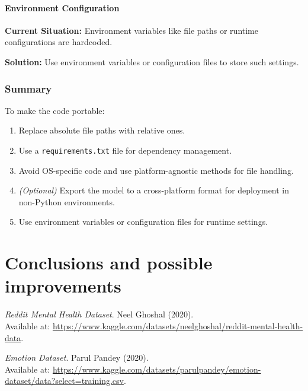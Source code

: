 \documentclass[runningheads,a4paper,11pt]{report}
\begin{document}
\subsubsection{Environment Configuration}
\label{section:enviroment-configuration}
\textbf{Current Situation:} Environment variables like file paths or runtime configurations are hardcoded.

\textbf{Solution:} Use environment variables or configuration files to store such settings.

\subsection{Summary}
\label{section:summary}
To make the code portable:
\begin{enumerate}
    \item Replace absolute file paths with relative ones.
    \item Use a \texttt{requirements.txt} file for dependency management.
    \item Avoid OS-specific code and use platform-agnostic methods for file handling.
    \item \textit{(Optional)} Export the model to a cross-platform format for deployment in non-Python environments.
    \item Use environment variables or configuration files for runtime settings.
\end{enumerate}

\chapter{Conclusions and possible improvements}
\label{chapter:conclusions-improvements}

\newpage
{} 
\begin{thebibliography}{99}

\textit{Reddit Mental Health Dataset}.  
Neel Ghoshal (2020).  
\\Available at: \url{https://www.kaggle.com/datasets/neelghoshal/reddit-mental-health-data}. 

\textit{Emotion Dataset}.  
Parul Pandey (2020).  
\\Available at: \url{https://www.kaggle.com/datasets/parulpandey/emotion-dataset/data?select=training.csv}.  

\end{thebibliography}
\end{document}
